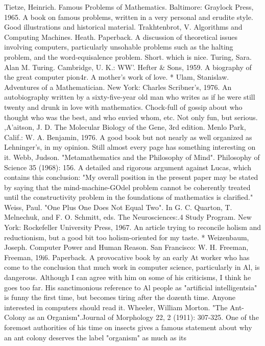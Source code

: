 Tietze, Heinrich. Famous Problems of Mathematics. Baltimore: Graylock Press, 1965. A
  book on famous problems, written in a very personal and erudite style. Good
  illustrations and historical material.
Trakhtenbrot, V. Algorithms and Computing Machines. Heath. Paperback. A discussion
  of theoretical issues involving computers, particularly unsohable problems such as the
  halting problem, and the word-equisalence problem. Short. which is nice.
Turing, Sara. Alan M. Turing. Cambridge, U. K.: WW'. Hefter \& Sons, 1959. A
  biography of the great computer pion4r. A mother's work of love.
* Ulam, Stanislaw. Adventures of a Mathematician. New York: Charles Scribner's, 1976.
  An autobiography written by a sixty-five-year old man who writes as if he were still
  twenty and drunk in love with mathematics. Chock-full of gossip about who thought
  who was the best, and who envied whom, etc. Not only fun, but serious.
,A'aitson, J. D. The Molecular Biology of the Gene, 3rd edition. Menlo Park, Calif.: W.
  A. Benjamin, 1976. A good book but not nearly as well organized as Lehninger's, in my
  opinion. Still almost every page has something interesting on it.
Webb, Judson. "Metamathematics and the Philosophy of Mind". Philosophy of Science
  35 (1968): 156. A detailed and rigorous argument against Lucas, which contains this
  conclusion: "My overall position in the present paper may be stated by saying that the
  mind-machine-GOdel problem cannot be coherently treated until the constructivity
  problem in the foundations of mathematics is clarified."
Weiss, Paul. "One Plus One Does Not Equal Two". In G. C. Quarton, T. Melnechuk, and
  F. O. Schmitt, eds. The Neurosciences:.4 Study Program. New York: Rockefeller
  University Press, 1967. An article trying to reconcile holism and reductionism, but a
  good bit too holism-oriented for my taste.
* Weizenbaum, Joseph. Computer Power and Human Reason. San Francisco: W. H.
  Freeman, Freeman, 19i6. Paperback. A provocative book by an early At worker who
  has come to the conclusion that much work in computer science, particularly in Al, is
  dangerous. Although I can agree with him on some of his criticisms, I think he goes too
  far. His sanctimonious reference to Al people as "artificial intelligentsia" is funny the
  first time, but becomes tiring after the dozenth time. Anyone interested in computers
  should read it.
Wheeler, William Morton. "The Ant-Colony as an Organism".Journal of Morphology
22, 2 (1911): 307-325. One of the foremost authorities of his time on insects gives a
famous statement about why an ant colony deserves the label "organism" as much as its
